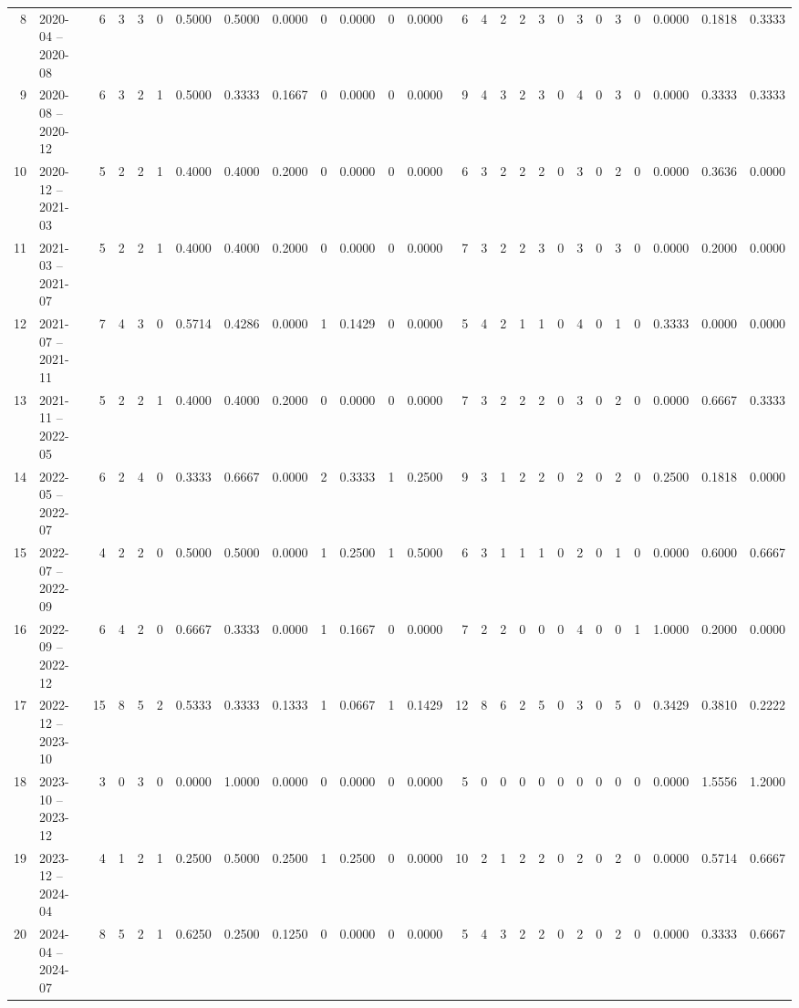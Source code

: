 \documentclass{article}
\begin{document}
\begin{center}
\begin{tabular}{rlrrrrrrrrrrrrrrrrrrrrrrrr}
  8 & 2020-04 -- 2020-08 & 6 & 3 & 3 & 0 & 0.5000 & 0.5000 & 0.0000 & 0 & 0.0000 & 0 & 0.0000 & 6 & 4 & 2 & 2 & 3 & 0 & 3 & 0 & 3 &     0 & 0.0000 & 0.1818 & 0.3333 \\ 
  9 & 2020-08 -- 2020-12 & 6 & 3 & 2 & 1 & 0.5000 & 0.3333 & 0.1667 & 0 & 0.0000 & 0 & 0.0000 & 9 & 4 & 3 & 2 & 3 & 0 & 4 & 0 & 3 &     0 & 0.0000 & 0.3333 & 0.3333 \\ 
  10 & 2020-12 -- 2021-03 & 5 & 2 & 2 & 1 & 0.4000 & 0.4000 & 0.2000 & 0 & 0.0000 & 0 & 0.0000 & 6 & 3 & 2 & 2 & 2 & 0 & 3 & 0 & 2 &     0 & 0.0000 & 0.3636 & 0.0000 \\ 
  11 & 2021-03 -- 2021-07 & 5 & 2 & 2 & 1 & 0.4000 & 0.4000 & 0.2000 & 0 & 0.0000 & 0 & 0.0000 & 7 & 3 & 2 & 2 & 3 & 0 & 3 & 0 & 3 &     0 & 0.0000 & 0.2000 & 0.0000 \\ 
  12 & 2021-07 -- 2021-11 & 7 & 4 & 3 & 0 & 0.5714 & 0.4286 & 0.0000 & 1 & 0.1429 & 0 & 0.0000 & 5 & 4 & 2 & 1 & 1 & 0 & 4 & 0 & 1 &     0 & 0.3333 & 0.0000 & 0.0000 \\ 
  13 & 2021-11 -- 2022-05 & 5 & 2 & 2 & 1 & 0.4000 & 0.4000 & 0.2000 & 0 & 0.0000 & 0 & 0.0000 & 7 & 3 & 2 & 2 & 2 & 0 & 3 & 0 & 2 &     0 & 0.0000 & 0.6667 & 0.3333 \\ 
  14 & 2022-05 -- 2022-07 & 6 & 2 & 4 & 0 & 0.3333 & 0.6667 & 0.0000 & 2 & 0.3333 & 1 & 0.2500 & 9 & 3 & 1 & 2 & 2 & 0 & 2 & 0 & 2 &     0 & 0.2500 & 0.1818 & 0.0000 \\ 
  15 & 2022-07 -- 2022-09 & 4 & 2 & 2 & 0 & 0.5000 & 0.5000 & 0.0000 & 1 & 0.2500 & 1 & 0.5000 & 6 & 3 & 1 & 1 & 1 & 0 & 2 & 0 & 1 &     0 & 0.0000 & 0.6000 & 0.6667 \\ 
  16 & 2022-09 -- 2022-12 & 6 & 4 & 2 & 0 & 0.6667 & 0.3333 & 0.0000 & 1 & 0.1667 & 0 & 0.0000 & 7 & 2 & 2 & 0 & 0 & 0 & 4 & 0 & 0 &     1 & 1.0000 & 0.2000 & 0.0000 \\ 
  17 & 2022-12 -- 2023-10 & 15 & 8 & 5 & 2 & 0.5333 & 0.3333 & 0.1333 & 1 & 0.0667 & 1 & 0.1429 & 12 & 8 & 6 & 2 & 5 & 0 & 3 & 0 & 5 &     0 & 0.3429 & 0.3810 & 0.2222 \\ 
  18 & 2023-10 -- 2023-12 & 3 & 0 & 3 & 0 & 0.0000 & 1.0000 & 0.0000 & 0 & 0.0000 & 0 & 0.0000 & 5 & 0 & 0 & 0 & 0 & 0 & 0 & 0 & 0 &     0 & 0.0000 & 1.5556 & 1.2000 \\ 
  19 & 2023-12 -- 2024-04 & 4 & 1 & 2 & 1 & 0.2500 & 0.5000 & 0.2500 & 1 & 0.2500 & 0 & 0.0000 & 10 & 2 & 1 & 2 & 2 & 0 & 2 & 0 & 2 &     0 & 0.0000 & 0.5714 & 0.6667 \\ 
  20 & 2024-04 -- 2024-07 & 8 & 5 & 2 & 1 & 0.6250 & 0.2500 & 0.1250 & 0 & 0.0000 & 0 & 0.0000 & 5 & 4 & 3 & 2 & 2 & 0 & 2 & 0 & 2 &     0 & 0.0000 & 0.3333 & 0.6667 \\ 

\end{tabular}
\end{center}
\end{document}
